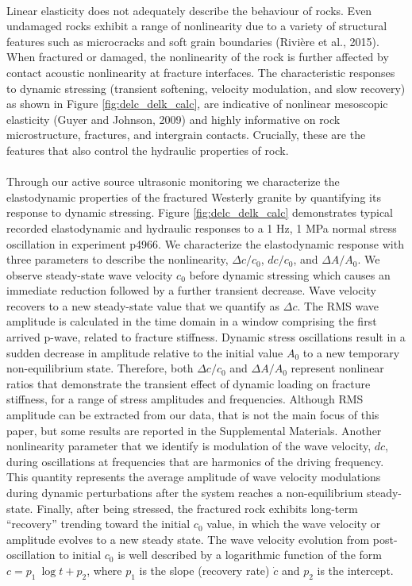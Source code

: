 \documentclass[letterpaper,10pt]{article}
\begin{document}
\paragraph{}
Linear elasticity does not adequately describe the behaviour of rocks. Even undamaged rocks exhibit a range of nonlinearity due to a variety of structural features such as microcracks and soft grain boundaries (Rivi\`ere et al., 2015). When fractured or damaged, the nonlinearity of the rock is further affected by contact acoustic nonlinearity at fracture interfaces. The characteristic responses to dynamic stressing (transient softening, velocity modulation, and slow recovery) as shown in Figure \ref{fig:delc_delk_calc}, are indicative of nonlinear mesoscopic elasticity (Guyer and Johnson, 2009) and highly informative on rock microstructure, fractures, and intergrain contacts. Crucially, these are the features that also control the hydraulic properties of rock.

\paragraph{}
Through our active source ultrasonic monitoring we characterize the elastodynamic properties of the fractured Westerly granite by quantifying its response to dynamic stressing. Figure \ref{fig:delc_delk_calc} demonstrates typical recorded elastodynamic and hydraulic responses to a 1 Hz, 1 MPa normal stress oscillation in experiment p4966. We characterize the elastodynamic response with three parameters to describe the nonlinearity, $ \Delta c/c_0 $, $ dc/c_0 $, and $ \Delta A/A_0 $. We observe steady-state wave velocity $ c_0 $ before dynamic stressing which causes an immediate reduction followed by a further transient decrease. Wave velocity recovers to a new steady-state value that we quantify as  $ \Delta c $.
The RMS wave amplitude is calculated in the time domain in a window comprising the first arrived p-wave, related to fracture stiffness. Dynamic stress oscillations result in a sudden decrease in amplitude relative to the initial value  $ A_0 $ to a new temporary non-equilibrium state. Therefore, both $ \Delta c/c_0 $ and $ \Delta A/A_0 $ represent nonlinear ratios that demonstrate the transient effect of dynamic loading on fracture stiffness, for a range of stress amplitudes and frequencies. Although RMS amplitude can be extracted from our data, that is not the main focus of this paper, but some results are reported in the Supplemental Materials.  
Another nonlinearity parameter that we identify is modulation of the wave velocity, $ dc $, during oscillations at frequencies that are harmonics of the driving frequency. This quantity represents the average amplitude of wave velocity modulations during dynamic perturbations after the system reaches a non-equilibrium steady-state. Finally, after being stressed, the fractured rock exhibits long-term ``recovery'' trending toward the initial $ c_0 $ value, in which the wave velocity or amplitude evolves to a new steady state. The wave velocity evolution from post-oscillation to initial $ c_0 $ is well described by a logarithmic function of the form $ c = p_1\ \log{t} + p_2 $, where $p_1$ is the slope (recovery rate) $ \dot c $ and $p_2$ is the intercept. 
\end{document}

